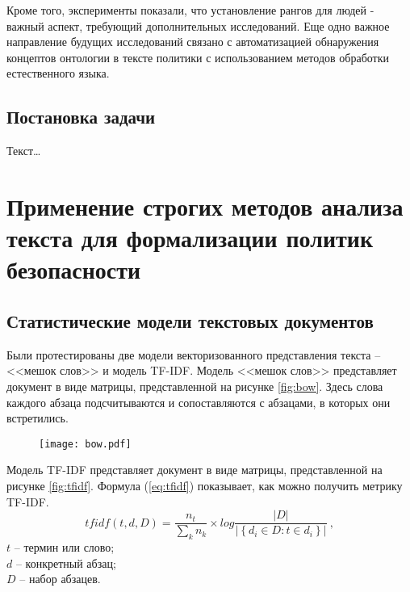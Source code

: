 \documentclass[../main]{subfiles}
\begin{document}
Кроме того, эксперименты показали, что установление рангов для людей - важный аспект, требующий дополнительных исследований. Еще одно важное направление будущих исследований связано с автоматизацией обнаружения концептов онтологии в тексте политики с использованием методов обработки естественного языка. 



\subsection{Постановка задачи}
Текст\dots

\newpage
\section{Применение строгих методов анализа текста для формализации политик безопасности}

\subsection{Статистические модели текстовых документов}

Были протестированы две модели векторизованного представления текста -- <<мешок слов>> и модель TF-IDF. Модель <<мешок слов>> представляет документ в виде матрицы, представленной на рисунке \ref{fig:bow}. Здесь слова каждого абзаца подсчитываются и сопоставляются с абзацами, в которых они встретились.

\begin{figure}[H]
    \centering
    {\texttt{[image: bow.pdf]}}
    \vspace{-\baselineskip}
\end{figure}


Модель TF-IDF представляет документ в виде матрицы, представленной на рисунке \ref{fig:tfidf}. Формула (\ref{eq:tfidf}) показывает, как можно получить метрику TF-IDF.
\begin{equation}
    \label{eq:tfidf}
    tfidf(t, d, D) = \frac{n_t}{\displaystyle\sum_k n_k} \times 
    log \frac{ \big|{D}\big| }
    { \big|\left\{ d_i \in D : t \in d_i \right\}\big| }\ ,
\end{equation}
$t$ -- термин или слово;\\
\makebox[12.5mm]{}$d$ -- конкретный абзац;\\
\makebox[12.5mm]{}$D$ -- набор абзацев. 
\end{document}
